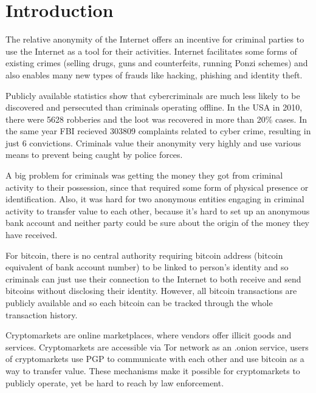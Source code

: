 \documentclass[
  digital, %
  table,   %
  lof,     %
  lot,     %
  oneside
]{fithesis3}
\begin{document}
\chapter{Introduction}

The relative anonymity of the Internet offers an incentive for criminal parties
to use the Internet as a tool for their activities.
Internet facilitates some forms of existing crimes (selling drugs, guns and
counterfeits, running Ponzi schemes) and also enables many new types of frauds like hacking, phishing and identity theft.

Publicly available statistics show that cybercriminals are much
 less likely to be discovered and persecuted than criminals operating offline.
 In the USA in 2010, there were 5628 robberies and the loot was recovered in more than 20\% cases. \parencite{fbi10} 
 In the same year FBI recieved 303809 complaints related to cyber crime, resulting in just 6 convictions. \parencite{fbcyber} 
Criminals value their anonymity very highly and use various means to prevent being caught by police forces.
\parencite{tzanetakis2016transparency}
\parencite{van2013surfing}
\parencite{aldridge2014not}

A big problem for criminals was getting the money they got from criminal activity to their possession,
since that required some form of physical presence or identification.
Also, it was hard for two anonymous entities engaging in criminal activity to transfer value to each other,
 because it's hard to set up an anonymous bank account and neither party could be sure about the origin of
 the money they have received.

For bitcoin, there is no central authority requiring bitcoin address
(bitcoin equivalent of bank account number) to be linked to person's identity and so 
criminals can just use their connection to the Internet to both receive and send bitcoins without disclosing their identity.
However, all bitcoin transactions are publicly available and so each bitcoin can be tracked through the whole transaction history.

 Cryptomarkets are online marketplaces, where vendors offer illicit goods and services.
 Cryptomarkets are accessible via Tor network as an .onion service, users of
 cryptomarkets use PGP to communicate with each other and use bitcoin as a way to transfer value.
These mechanisms make it possible for cryptomarkets to publicly operate, yet be hard to reach by law enforcement.
\parencite{cox2016staying}
\end{document}
